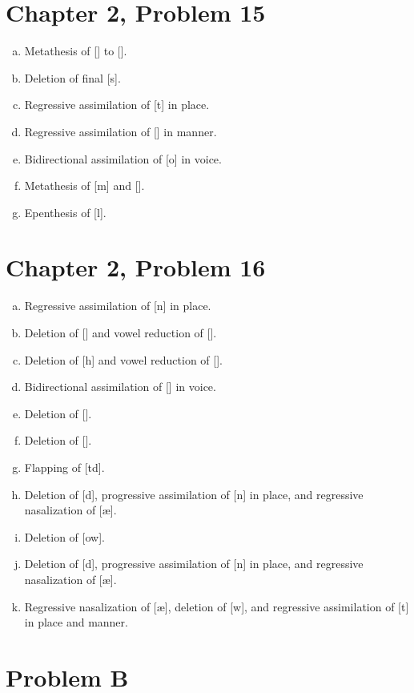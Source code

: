 \documentclass[12pt]{article}
\begin{document}
\section*{Chapter 2, Problem 15}

\begin{enumerate}[a)]
    \item Metathesis of [] to [].
    \item Deletion of final [s].
    \item Regressive assimilation of [t] in place.
    \item Regressive assimilation of [\textfishhookr] in manner.
    \item Bidirectional assimilation of [o] in voice.
    \item Metathesis of [m] and [\textgamma].
    \item Epenthesis of [l].
\end{enumerate}

\section*{Chapter 2, Problem 16}

\begin{enumerate}[a)]
    \item Regressive assimilation of [n] in place.
    \item Deletion of [\dh] and vowel reduction of [\textepsilon].
    \item Deletion of [h] and vowel reduction of [\textsci].
    \item Bidirectional assimilation of [\texttheta] in voice.
    \item Deletion of [\textschwa].
    \item Deletion of [\textupsilon].
    \item Flapping of [td].
    \item Deletion of [d], progressive assimilation of [n] in place, and regressive nasalization of [\ae].
    \item Deletion of [ow].
    \item Deletion of [d], progressive assimilation of [n] in place, and regressive nasalization of [\ae].
    \item Regressive nasalization of [\ae], deletion of [w\textsci], and regressive assimilation of [t] in place and manner.
\end{enumerate}

\section*{Problem B}
\end{document}
